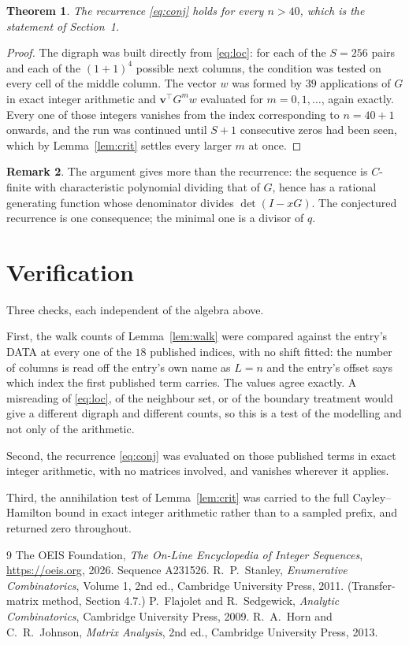 \documentclass[11pt,a4paper]{article}
\theoremstyle{plain}
\newtheorem{theorem}{Theorem}
\theoremstyle{definition}
\newtheorem{remark}[theorem]{Remark}
\begin{document}
\begin{theorem}
The recurrence \eqref{eq:conj} holds for every $n>40$, which is the statement of
Section~1.
\end{theorem}

\begin{proof}
The digraph was built directly from \eqref{eq:loc}: for each of the $S=256$ pairs and each
of the $(1+1)^{4}$ possible next columns, the condition was tested on every cell of
the middle column. The vector $w$ was formed by $39$ applications of $G$ in exact integer
arithmetic and $\mathbf{v}^{\!\top}G^{m}w$ evaluated for $m=0,1,\dots$, again exactly.
Every one of those integers vanishes from the index corresponding to $n=40+1$ onwards,
and the run was continued until $S+1$ consecutive zeros had been seen, which by
Lemma~\ref{lem:crit} settles every larger $m$ at once.
\end{proof}

\begin{remark}
The argument gives more than the recurrence: the sequence is $C$-finite with characteristic
polynomial dividing that of $G$, hence has a rational generating function whose denominator
divides $\det(I-xG)$. The conjectured recurrence is one consequence; the minimal one is a
divisor of $q$.
\end{remark}

\section{Verification}

Three checks, each independent of the algebra above.

First, the walk counts of Lemma~\ref{lem:walk} were compared against the entry's DATA at
every one of the $18$ published indices, with no shift fitted: the number of columns is
read off the entry's own name as $L=n$ and the entry's offset says which index the first
published term carries. The values agree exactly. A misreading of \eqref{eq:loc}, of the
neighbour set, or of the boundary treatment would give a different digraph and different
counts, so this is a test of the modelling and not only of the arithmetic.

Second, the recurrence \eqref{eq:conj} was evaluated on those published terms in exact
integer arithmetic, with no matrices involved, and vanishes wherever it applies.

Third, the annihilation test of Lemma~\ref{lem:crit} was carried to the full
Cayley--Hamilton bound in exact integer arithmetic rather than to a sampled prefix, and
returned zero throughout.

\begin{thebibliography}{9}
 The OEIS Foundation, \emph{The On-Line Encyclopedia of Integer
Sequences}, \url{https://oeis.org}, 2026. Sequence A231526.
 R.~P.~Stanley, \emph{Enumerative Combinatorics}, Volume 1, 2nd ed.,
Cambridge University Press, 2011. (Transfer-matrix method, Section 4.7.)
 P.~Flajolet and R.~Sedgewick, \emph{Analytic Combinatorics}, Cambridge
University Press, 2009.
 R.~A.~Horn and C.~R.~Johnson, \emph{Matrix Analysis}, 2nd ed., Cambridge
University Press, 2013.
\end{thebibliography}
\end{document}
